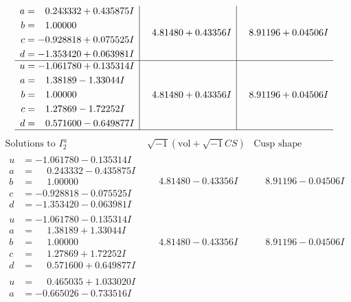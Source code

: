 \documentclass[1p]{elsarticle_modified}
\theoremstyle{definition}
\newcommand{\I}{\sqrt{-1}}
\begin{document}
$$\begin{array}{c|c|c}
\begin{aligned}
a &= \phantom{-}0.243332 + 0.435875 I \\
b &= \phantom{-}1.00000\phantom{ +0.000000I} \\
c &= -0.928818 + 0.075525 I \\
d &= -1.353420 + 0.063981 I\end{aligned}
 & \phantom{-}4.81480 + 0.43356 I & \phantom{-}8.91196 + 0.04506 I \\ \hline\begin{aligned}
u &= -1.061780 + 0.135314 I \\
a &= \phantom{-}1.38189 - 1.33044 I \\
b &= \phantom{-}1.00000\phantom{ +0.000000I} \\
c &= \phantom{-}1.27869 - 1.72252 I \\
d &= \phantom{-}0.571600 - 0.649877 I\end{aligned}
 & \phantom{-}4.81480 + 0.43356 I & \phantom{-}8.91196 + 0.04506 I\\
 \hline 
 \end{array}$$\newpage$$\begin{array}{c|c|c}  
\text{Solutions to }I^u_{2}& \I (\text{vol} + \sqrt{-1}CS) & \text{Cusp shape}\\
 \hline 
\begin{aligned}
u &= -1.061780 - 0.135314 I \\
a &= \phantom{-}0.243332 - 0.435875 I \\
b &= \phantom{-}1.00000\phantom{ +0.000000I} \\
c &= -0.928818 - 0.075525 I \\
d &= -1.353420 - 0.063981 I\end{aligned}
 & \phantom{-}4.81480 - 0.43356 I & \phantom{-}8.91196 - 0.04506 I \\ \hline\begin{aligned}
u &= -1.061780 - 0.135314 I \\
a &= \phantom{-}1.38189 + 1.33044 I \\
b &= \phantom{-}1.00000\phantom{ +0.000000I} \\
c &= \phantom{-}1.27869 + 1.72252 I \\
d &= \phantom{-}0.571600 + 0.649877 I\end{aligned}
 & \phantom{-}4.81480 - 0.43356 I & \phantom{-}8.91196 - 0.04506 I \\ \hline\begin{aligned}
u &= \phantom{-}0.465035 + 1.033020 I \\
a &= -0.665026 - 0.733516 I \\

\end{aligned}
\end{array}$$
\end{document}
